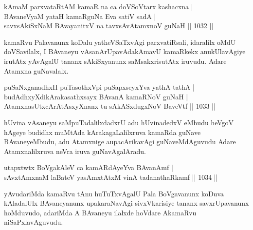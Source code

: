 
\begin{shl}
kAmaM parxvataRtAM kamaR na ca doVSoV\s tarx kashacxna | \\
\footnotemark[2]BAvaneVyaM yataH kamaRguNa Eva satiV sadA | \\
savxsAkiSxNaM BAvayanitxV na tavxsAvAtamxnoV guNaH \hfill||  1032 ||  
\end{shl}

\begin{artha}
kamaRvu Palavanunx koDalu yatheVSaTxvAgi parxvatiRsali, idaralilx oMdU doVSavilalx, I BAvaneyu vAsanArUpavAdakAmavU kamaRkekx anukUlavAgiye irutAtx yAvAgalU tananx sAkiSxyanunx saMsakxrisutAtx iruvudu. Adare Atamxna guNavalalx.
\end{artha}

\begin{shl}
puSaNxganadhxH puTasothxV\s pi puSapxseyxYva yathA tathA | \\
budAdhxyXdikArakasathxsayx BAvanA kamaRNoV guNaH | \\
\footnotemark[1]AtamxnasUtxcArAtAsxyXnanx tu sAkASxdugxNoV BaveVtf \hfill||  1033 || 
\end{shl}

\begin{artha}
hUvina vAsaneyu saMpuTadalilxdadxrU adu hUvinadedxV eMbudu heVgoV hAgeye budidhx muMtAda kArakagaLalilxruva kamaRda guNave BAvaneyeMbudu, adu Atamxnige aupacArikavAgi guNaveMdAguvudu Adare Atamxnalilxruva neVra iruva guNavAgalAradu.
\end{artha}


\begin{shl}
\footnotemark[2]utapxtwtx BoVgakAleV ca kamAR\s \s dAyeYva BAvanAmf | \\
sAvxtAmxnaM laBateV yasAmxtAtxM vinA tadanathaRkamf \hfill||  1034 ||  
\end{shl}

\begin{artha}
yAvudariMda kamaRvu tAnu huTuTxvAgalU Pala BoVgavanunx koDuva kAladalUlx BAvaneyanunx upakaraNavAgi sivxVkarisiye tananx savxrUpavanunx hoMduvudo, adariMda A BAvaneyu ilalxde hoVdare AkamaRvu niSaPxlavAguvudu.
\end{artha}

